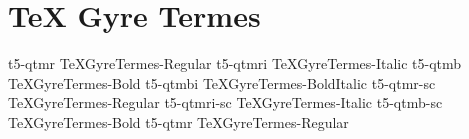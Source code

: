 \documentclass[sample]{vnsample}
\begin{document}
\section{TeX Gyre Termes}
    {t5-qtmr}     {TeXGyreTermes-Regular}
   {t5-qtmri}    {TeXGyreTermes-Italic}
    {t5-qtmb}     {TeXGyreTermes-Bold}
   {t5-qtmbi}    {TeXGyreTermes-BoldItalic}
   {t5-qtmr-sc}  {TeXGyreTermes-Regular}
 {t5-qtmri-sc} {TeXGyreTermes-Italic}
   {t5-qtmb-sc}  {TeXGyreTermes-Bold}
    {t5-qtmr}     {TeXGyreTermes-Regular}
\end{document}

